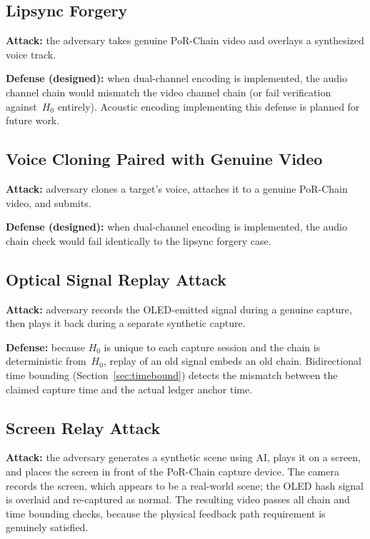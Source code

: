 \documentclass[11pt]{article}
\begin{document}
\subsection{Lipsync Forgery}

\textbf{Attack:} the adversary takes genuine PoR-Chain video and overlays a
synthesized voice track.

\textbf{Defense (designed):} when dual-channel encoding is implemented, the audio
channel chain would mismatch the video channel chain (or fail verification
against~$H_0$ entirely). Acoustic encoding implementing this defense is planned
for future work.

\subsection{Voice Cloning Paired with Genuine Video}

\textbf{Attack:} adversary clones a target's voice, attaches it to a genuine
PoR-Chain video, and submits.

\textbf{Defense (designed):} when dual-channel encoding is implemented, the audio
chain check would fail identically to the lipsync forgery case.

\subsection{Optical Signal Replay Attack}

\textbf{Attack:} adversary records the OLED-emitted signal during a genuine capture,
then plays it back during a separate synthetic capture.

\textbf{Defense:} because $H_0$ is unique to each capture session and the chain is
deterministic from~$H_0$, replay of an old signal embeds an old chain. Bidirectional
time bounding (Section~\ref{sec:timebound}) detects the mismatch between the claimed
capture time and the actual ledger anchor time.

\subsection{Screen Relay Attack}

\textbf{Attack:} the adversary generates a synthetic scene using AI, plays it on a
screen, and places the screen in front of the PoR-Chain capture device. The camera
records the screen, which appears to be a real-world scene; the OLED hash signal is
overlaid and re-captured as normal. The resulting video passes all chain and time
bounding checks, because the physical feedback path requirement is genuinely
satisfied.
\end{document}
